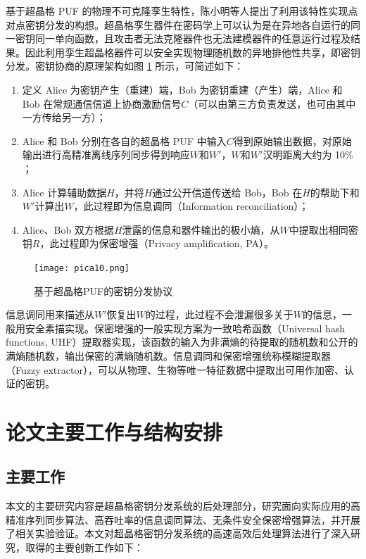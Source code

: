 基于超晶格 PUF 的物理不可克隆孪生特性，陈小明等人提出了利用该特性实现点对点密钥分发的构想\cite{chen2020}。超晶格孪生器件在密码学上可以认为是在异地各自运行的同一密钥同一单向函数，且攻击者无法克隆器件也无法建模器件的任意运行过程及结果。因此利用孪生超晶格器件可以安全实现物理随机数的异地排他性共享，即密钥分发\cite{wu2020experimental,xie2021high}。密钥协商的原理架构如图 \ref{pica10} 所示，可简述如下： 
\begin{enumerate}[(1)]
	\item 定义 Alice 为密钥产生（重建）端，Bob 为密钥重建（产生）端，Alice 和 Bob 在常规通信信道上协商激励信号$C$（可以由第三方负责发送，也可由其中一方传给另一方）；
	\item Alice 和 Bob 分别在各自的超晶格 PUF 中输入$C$得到原始输出数据，对原始输出进行高精准离线序列同步得到响应$W$和$W'$，$W$和$W'$汉明距离大约为 10\% ；
	\item Alice 计算辅助数据$H$，并将$H$通过公开信道传送给 Bob，Bob 在$H$的帮助下和$W'$计算出$W$，此过程即为信息调同（Information reconciliation）\cite{dodis2004fuzzy}；
	\item Alice、Bob 双方根据$H$泄露的信息和器件输出的极小熵，从$W$中提取出相同密钥$R$，此过程即为保密增强（Privacy amplification, PA）\cite{bennett1995generalized}。
\end{enumerate}


\begin{figure}[h]
	\centering
	\texttt{[image: pica10.png]}
	\caption{基于超晶格PUF的密钥分发协议}
	\label{pica10}
\end{figure}

信息调同用来描述从$W'$恢复出$W$的过程，此过程不会泄漏很多关于$W$的信息，一般用安全素描实现。保密增强的一般实现方案为一致哈希函数（Universal hash functions, UHF）提取器实现\cite{carter1979universal}，该函数的输入为非满熵的待提取的随机数和公开的满熵随机数，输出保密的满熵随机数。信息调同和保密增强统称模糊提取器（Fuzzy extractor），可以从物理、生物等唯一特征数据中提取出可用作加密、认证的密钥。


\section{论文主要工作与结构安排}
\subsection{主要工作}

本文的主要研究内容是超晶格密钥分发系统的后处理部分，研究面向实际应用的高精准序列同步算法、高吞吐率的信息调同算法、无条件安全保密增强算法，并开展了相关实验验证。本文对超晶格密钥分发系统的高速高效后处理算法进行了深入研究，取得的主要创新工作如下：

